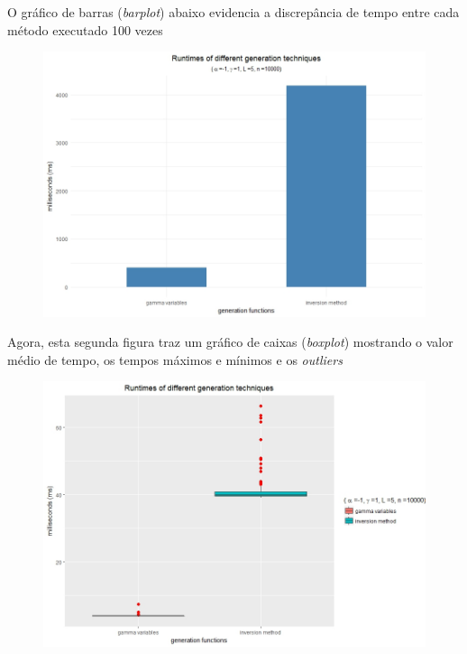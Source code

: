 \documentclass[12pt,letterpaper]{article}
\begin{document}
O gráfico de barras (\textit{barplot}) abaixo evidencia a discrepância de tempo entre cada método executado 100 vezes

\begin{figure}[H]
	\begin{center}
		\includegraphics[width=0.95\columnwidth]{bar_L5}
	\end{center}
\end{figure}

Agora, esta segunda figura traz um gráfico de caixas (\textit{boxplot}) mostrando o valor médio de tempo, os tempos máximos e mínimos e os \textit{outliers}


\begin{figure}[H]
	\begin{center}
		\includegraphics[width=0.95\columnwidth]{box_L5}
	\end{center}
\end{figure}
\end{document}
